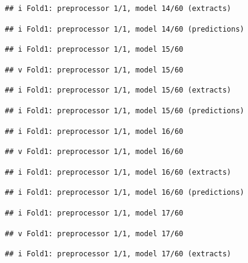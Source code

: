 \documentclass[
]{article}
\begin{document}
\begin{verbatim}
## i Fold1: preprocessor 1/1, model 14/60 (extracts)
\end{verbatim}

\begin{verbatim}
## i Fold1: preprocessor 1/1, model 14/60 (predictions)
\end{verbatim}

\begin{verbatim}
## i Fold1: preprocessor 1/1, model 15/60
\end{verbatim}

\begin{verbatim}
## v Fold1: preprocessor 1/1, model 15/60
\end{verbatim}

\begin{verbatim}
## i Fold1: preprocessor 1/1, model 15/60 (extracts)
\end{verbatim}

\begin{verbatim}
## i Fold1: preprocessor 1/1, model 15/60 (predictions)
\end{verbatim}

\begin{verbatim}
## i Fold1: preprocessor 1/1, model 16/60
\end{verbatim}

\begin{verbatim}
## v Fold1: preprocessor 1/1, model 16/60
\end{verbatim}

\begin{verbatim}
## i Fold1: preprocessor 1/1, model 16/60 (extracts)
\end{verbatim}

\begin{verbatim}
## i Fold1: preprocessor 1/1, model 16/60 (predictions)
\end{verbatim}

\begin{verbatim}
## i Fold1: preprocessor 1/1, model 17/60
\end{verbatim}

\begin{verbatim}
## v Fold1: preprocessor 1/1, model 17/60
\end{verbatim}

\begin{verbatim}
## i Fold1: preprocessor 1/1, model 17/60 (extracts)
\end{verbatim}
\end{document}
